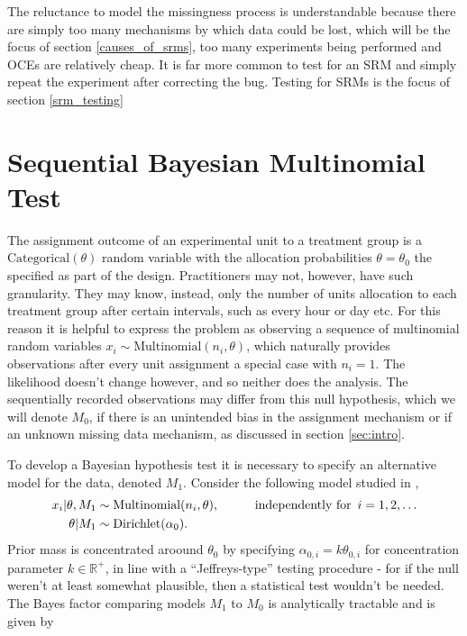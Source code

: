 \documentclass[11pt]{article}
\begin{document}
The reluctance to model the missingness process is understandable because there are simply too many mechanisms by which data could be lost, which will be the focus of section \ref{causes_of_srms}, too many experiments being performed and OCEs are relatively cheap.
It is far more common to test for an SRM and simply repeat the experiment after correcting the bug.
Testing for SRMs is the focus of section \ref{srm_testing} 

\section{Sequential Bayesian Multinomial Test}
\label{sec:srm_testing}
The assignment outcome of an experimental unit to a treatment group is a $\text{Categorical}(\theta)$ random variable with the allocation probabilities $\theta=\theta_0$ the specified as part of the design.
Practitioners may not, however, have such granularity.
They may know, instead, only the number of units allocation to each treatment group after certain intervals, such as every hour or day etc.
For this reason it is helpful to express the problem as observing a sequence of multinomial random variables $x_i \sim \text{Multinomial}(n_i, \theta)$, which naturally provides observations after every unit assignment a special case with $n_i = 1$.
The likelihood doesn't change however, and so neither does the analysis.
The sequentially recorded observations may differ from this null hypothesis, which we will denote $M_0$, if there is an unintended bias in the assignment mechanism or if an unknown missing data mechanism, as discussed in section \ref{sec:intro}.

To develop a Bayesian hypothesis test it is necessary to specify an alternative model for the data, denoted $M_1$.
Consider the following model studied in \cite{good},
\begin{align}
    x_i | \theta, M_1 &\sim \text{Multinomial}(n_i,\theta), \hspace{1cm} \text{independently for }\, i=1,2,\dots\\
  \theta | M_1 &\sim \text{Dirichlet}(\alpha_0).\notag
\end{align}
Prior mass is concentrated aroound $\theta_0$ by specifying $\alpha_{0,i} = k \theta_{0,i}$ for concentration parameter $k \in \mathbb{R}^+$, in line with a ``Jeffreys-type'' testing procedure - for if the null weren't at least somewhat plausible, then a statistical test wouldn't be needed.
The Bayes factor comparing models $M_1$ to $M_0$ is analytically tractable and is given by
\end{document}
